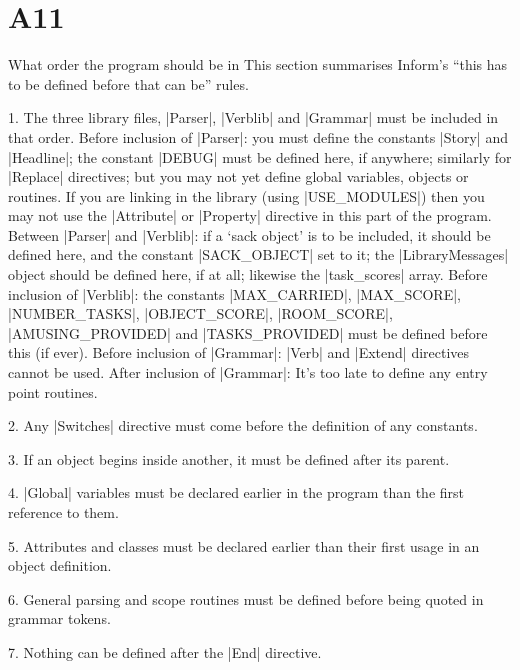 \section{A11}{What order the program should be in}%
This section summarises Inform's ``this has to be defined before
that can be'' rules.
\smallskip
\item{1.} The three library files, |Parser|, |Verblib| and |Grammar| must be
included in that order.
\smallskip
{} Before inclusion of |Parser|: you must define the constants
|Story| and |Headline|; the constant |DEBUG| must be defined here, if
anywhere; similarly for |Replace| directives; but you may not yet define global
variables, objects or routines.  If you are linking in the library
(using |USE_MODULES|) then you may not use the |Attribute| or |Property|
directive in this part of the program.
 Between |Parser| and |Verblib|: if a `sack object' is
to be included, it should be defined here, and the constant |SACK_OBJECT|
set to it; the |LibraryMessages| object should be defined here, if at
all; likewise the |task_scores| array.
 Before inclusion of |Verblib|: the constants
\begindisplay
\qquad |MAX_CARRIED|, |MAX_SCORE|, |NUMBER_TASKS|, |OBJECT_SCORE|,\cr
\qquad |ROOM_SCORE|, |AMUSING_PROVIDED| and |TASKS_PROVIDED|\cr
\enddisplay
must be defined before this (if ever).
 Before inclusion of |Grammar|: |Verb| and |Extend| directives
cannot be used.
 After inclusion of |Grammar|: It's too late to define any
entry point routines.

\smallskip
\item{2.} Any |Switches| directive must come before the definition of any
constants.
\item{3.} If an object begins inside another, it must be defined after its
parent.
\item{4.} |Global| variables must be declared earlier in the
program than the first reference to them.
\item{5.} Attributes and classes must be declared earlier than
their first usage in an object definition.
\item{6.} General parsing and scope routines must be defined before being quoted
in grammar tokens.
\item{7.} Nothing can be defined after the |End| directive.


\tenpoint

\vfill\eject\lexicontrue{}


\ninepoint

